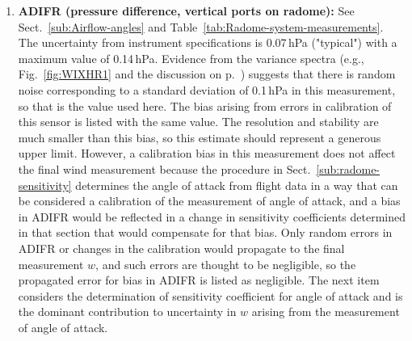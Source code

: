 \documentclass[12pt,twoside,english]{article}\usepackage[]{graphicx}\usepackage[]{color}
\let\OrgIndex\index
\renewcommand*{\index}[1]{\OrgIndex{#1}}
\begin{document}
\begin{enumerate}
\item \textbf{ADIFR (pressure difference, vertical ports on radome): }See Sect.~\ref{sub:Airflow-angles} and Table~\ref{tab:Radome-system-measurements}. The uncertainty from instrument specifications is 0.07\,hPa ("typical") with a maximum value of 0.14\,hPa. Evidence from the variance spectra (e.g., Fig.~\ref{fig:WIXHR1} and the discussion on p.~\pageref{page:ADIFRnoise}) suggests that there is random noise corresponding to a standard deviation of 0.1\,hPa in this measurement, so that is the value used here. The bias arising from errors in calibration of this sensor is listed with the same value. The resolution and stability are much smaller than this bias, so this estimate should represent a generous upper limit. However, a calibration bias in this measurement does not affect the final wind measurement because the procedure in Sect.~\ref{sub:radome-sensitivity} determines the angle of attack from flight data in a way that can be considered a calibration of the measurement of angle of attack, and a bias in ADIFR would be reflected in a change in sensitivity coefficients determined in that section that would compensate for that bias. Only random errors in ADIFR or changes in the calibration would propagate to the final measurement $w$, and such errors are thought to be negligible, so the propagated error for bias in ADIFR is listed as negligible. The next item considers the determination of sensitivity coefficient for angle of attack and is the dominant contribution to uncertainty in $w$ arising from the measurement of angle of attack.  

\end{enumerate}
\end{document}

